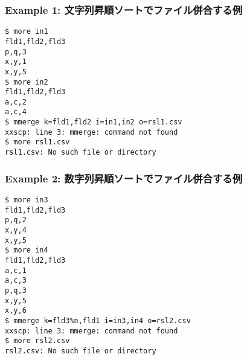 \subsubsection*{Example 1: 文字列昇順ソートでファイル併合する例}



\begin{Verbatim}[baselinestretch=0.7,frame=single]
$ more in1
fld1,fld2,fld3
p,q,3
x,y,1
x,y,5
$ more in2
fld1,fld2,fld3
a,c,2
a,c,4
$ mmerge k=fld1,fld2 i=in1,in2 o=rsl1.csv
xxscp: line 3: mmerge: command not found
$ more rsl1.csv
rsl1.csv: No such file or directory
\end{Verbatim}
\subsubsection*{Example 2: 数字列昇順ソートでファイル併合する例}



\begin{Verbatim}[baselinestretch=0.7,frame=single]
$ more in3
fld1,fld2,fld3
p,q,2
x,y,4
x,y,5
$ more in4
fld1,fld2,fld3
a,c,1
a,c,3
p,q,3
x,y,5
x,y,6
$ mmerge k=fld3%n,fld1 i=in3,in4 o=rsl2.csv
xxscp: line 3: mmerge: command not found
$ more rsl2.csv
rsl2.csv: No such file or directory
\end{Verbatim}
